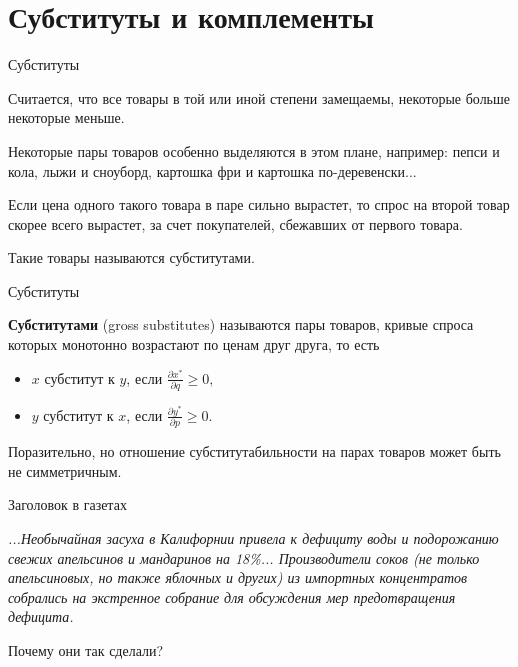 \documentclass{beamer}
\begin{document}
\section{Субституты и комплементы}

\begin{frame}{Субституты}

Считается, что \alert{все товары в той или иной степени замещаемы}, некоторые больше некоторые меньше. 

Некоторые пары товаров особенно выделяются в этом плане, например: пепси и кола, лыжи и сноуборд, картошка фри и картошка по-деревенски... 

Если цена одного такого товара в паре сильно вырастет, то спрос на второй товар скорее всего вырастет, за счет покупателей, сбежавших от первого товара.

Такие товары называются субститутами.

\end{frame}

\begin{frame}{Субституты}

\begin{definition}
\textbf{\alert{Субститутами}} (gross substitutes) называются пары товаров, кривые спроса которых монотонно возрастают по ценам друг друга, то есть
\begin{itemize}
  \item $x$ субститут к $y$, если $\frac{\partial x^{\ast}}{\partial q} \geqslant 0,$
  \item $y$ субститут к $x$, если $\frac{\partial y^{\ast}}{\partial p} \geqslant 0.$
\end{itemize}
\end{definition}

Поразительно, но отношение субститутабильности на парах товаров может быть не симметричным.

\end{frame}

\begin{frame}{Заголовок в газетах}

\textit{...Необычайная засуха в Калифорнии привела к дефициту воды и подорожанию свежих апельсинов и мандаринов на 18\%... Производители соков (не только апельсиновых, но также яблочных и других) из импортных концентратов собрались на экстренное собрание для обсуждения мер предотвращения дефицита.}

Почему они так сделали?

\end{frame}
\end{document}
